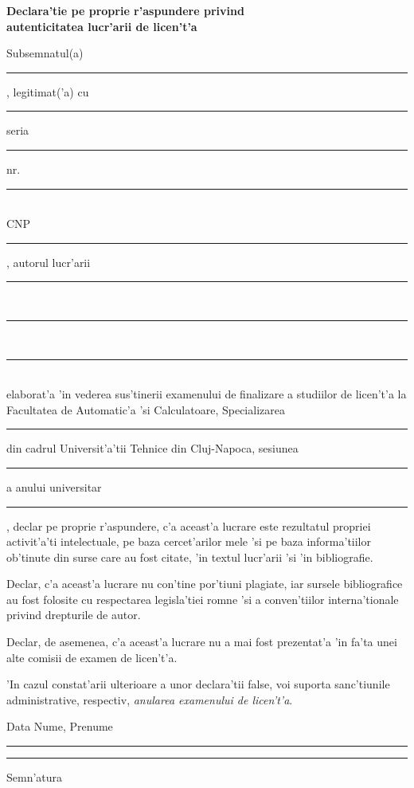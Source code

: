 \documentclass[12pt,a4paper,twoside]{report}
\newcommand{\uline}[1]{\rule[0pt]{#1}{0.4pt}}
\begin{document}
\begin{center}
{\bf
Declara'tie pe proprie r'aspundere privind\\ 
autenticitatea lucr'arii de licen't'a}
\end{center}
\vspace{1cm}



Subsemnatul(a) \\
\uline{14.8cm}, 
legitimat('a) cu \uline{4cm} seria \uline{3cm} nr. \uline{4cm}\\
CNP \uline{9cm}, autorul lucr'arii \uline{2.8cm}\\
\uline{16cm}\\
\uline{16cm}\\
elaborat'a 'in vederea sus'tinerii examenului de finalizare a studiilor de licen't'a la Facultatea de Automatic'a 'si Calculatoare, Specializarea \uline{7cm} din cadrul Universit'a'tii Tehnice din Cluj-Napoca, sesiunea \uline{4cm} a anului universitar \uline{3cm}, declar pe proprie r'aspundere, c'a aceast'a lucrare este rezultatul propriei activit'a'ti intelectuale, pe baza cercet'arilor mele 'si pe baza informa'tiilor ob'tinute din surse care au fost citate, 'in textul lucr'arii 'si 'in bibliografie.

Declar, c'a aceast'a lucrare nu con'tine por'tiuni plagiate, iar sursele bibliografice au fost folosite cu respectarea legisla'tiei rom\ia ne 'si a conven'tiilor interna'tionale privind drepturile de autor.

Declar, de asemenea, c'a aceast'a lucrare nu a mai fost prezentat'a 'in fa'ta unei alte comisii de examen de licen't'a.

'In cazul constat'arii ulterioare a unor declara'tii false, voi suporta sanc'tiunile administrative, respectiv, \emph{anularea examenului de licen't'a}.

\vspace{1.5cm}

Data \hspace{8cm} Nume, Prenume

\vspace{0.5cm}

\uline{3cm} \hspace{5cm} \uline{5cm}

\vspace{1cm}
\hspace{9.4cm}Semn'atura

\thispagestyle{empty}

\newpage
\end{document}
